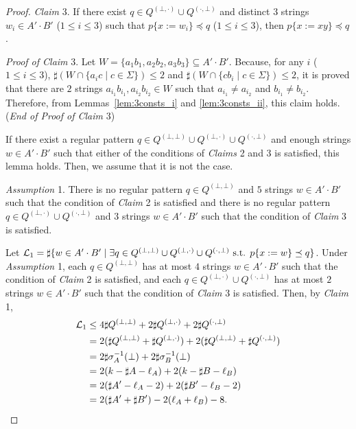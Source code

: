 \begin{proof}
\smallskip

\noindent
\textit{Claim} 3. If there exist $q \in Q^{(\bot,\cdot)} \cup Q^{(\cdot,\bot)}$ and distinct $3$ strings $w_{i} \in A'\cdot B'$ ($1\leq i\leq 3$) such that $p \{ x:=w_{i} \} \preceq q$ ($1\leq i\leq 3$),  then $p \{ x:=xy \} \preceq q$.

\noindent
\textit{Proof of Claim} 3.
Let $W = \{a_{1}b_{1},a_{2}b_{2},a_{3}b_{3}\} \subseteq A'\cdot B'$.
Because, for any $i$ ($1\leq i\leq 3$), $\sharp(W \cap \{a_{i}c \mid c \in \Sigma\}) \leq 2$ and  $\sharp (W \cap \{cb_{i} \mid c \in \Sigma\}) \leq 2$, {\color{black} it is proved} that there are $2$ strings $a_{i_{1}}b_{i_{1}},a_{i_{2}}b_{i_{2}}\in W$ such that $a_{i_{1}} \not= a_{i_{2}}$ and $b_{i_{1}} \not= b_{i_{2}}$.
Therefore, from Lemmas~\ref{lem:3consts_i} and \ref{lem:3consts_ii}, this claim holds. (\textit{End of Proof of Claim} 3)

\smallskip

\noindent
If there exist a regular pattern $q \in Q^{(\bot,\bot)} \cup Q^{(\bot,\cdot)} \cup Q^{(\cdot,\bot)}$ and enough strings $w \in A'\cdot B'$ such that either of the conditions of \textit{Claims} 2 and 3 is satisfied, this lemma holds. Then, we assume that it is not the case.

\smallskip

\noindent
\textit{Assumption} 1.
There is no regular pattern $q \in Q^{(\bot,\bot)}$ and $5$ strings $w \in A'\cdot B'$ such that the condition of \textit{Claim} 2 is satisfied and there is no regular pattern $q \in Q^{(\bot,\cdot)} \cup Q^{(\cdot,\bot)}$ and $3$ strings $w \in A'\cdot B'$ such that the condition of \textit{Claim} 3 is satisfied.

\smallskip

\noindent
Let ${\cal L}_{1} = \sharp\{w \in A'\cdot B' \mid \exists q \in Q^{(\bot,\bot)} \cup Q^{(\bot,\cdot)} \cup Q^{(\cdot,\bot)} \mbox{ s.t. } p\{x:=w\} \preceq q\}$.
Under \textit{Assumption} 1, each $q\in Q^{(\bot,\bot)}$ has at most $4$ strings $w \in A'\cdot B'$ such that the condition of \textit{Claim} 2 is satisfied, and each $q \in Q^{(\bot,\cdot)} \cup Q^{(\cdot,\bot)}$ has at most $2$ strings $w \in A'\cdot B'$ such that the condition of \textit{Claim} 3 is satisfied.
Then, by \textit{Claim} 1,
\begin{align*}
  {\cal L}_{1} &\leq 4\sharp Q^{(\bot,\bot)} + 2\sharp Q^{(\bot,\cdot)} + 2\sharp Q^{(\cdot,\bot)}\\
  & = 2(\sharp Q^{(\bot,\bot)} + \sharp Q^{(\bot,\cdot)}) + 2(\sharp Q^{(\bot,\bot)} + \sharp Q^{(\cdot,\bot)})\\
  & = 2\sharp \sigma_{A}^{-1}(\bot) + 2\sharp \sigma_{B}^{-1}(\bot)\\
  & = 2(k - \sharp A - \ell_{A}) + 2(k - \sharp B - \ell_{B})\\
  & = 2(\sharp A' - \ell_{A} - 2) + 2(\sharp B' - \ell_{B} - 2)\\
  & = 2(\sharp A' + \sharp B') - 2(\ell_{A} + \ell_{B}) - 8.
\end{align*}


\end{proof}
